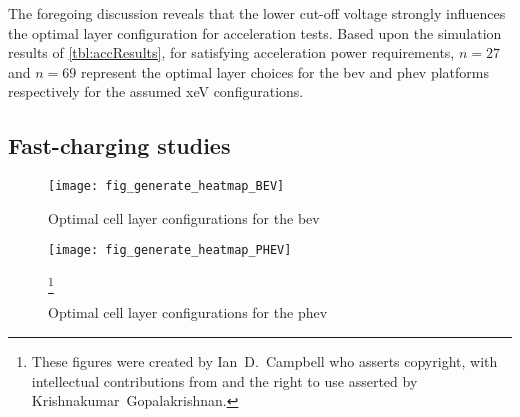 The foregoing  discussion reveals  that the lower cut-off  voltage strongly
influences  the optimal layer   configuration  for   acceleration  tests.
Based upon the simulation results of \cref{tbl:accResults},  for satisfying
acceleration power requirements, ${n = 27}$ and ${n=69}$ represent the optimal
layer choices for the \gls{bev} and \gls{phev} platforms respectively for the
assumed \gls{xeV} configurations.

\subsection{Fast-charging studies}\label{sec:fastchgresults}

\begin{figure}[p]
    \begin{minipage}[t]{\textwidth}
        \centering
        \texttt{[image: fig\_generate\_heatmap\_BEV]}
        \captionsetup{labelsep=note}
        \caption[Optimal cell layer configurations for the  for a range of fast charging powers and thermal conditions]{Optimal cell layer configurations for the \gls{bev}}
        \label{fig:fig_generate_heatmap_BEV}
        \setcounter{footnote}{8}
        \vspace*{\floatsep}
        \texttt{[image: fig\_generate\_heatmap\_PHEV]}
        \caption[Optimal cell layer configurations for the  for a range of
        fast charging powers and thermal conditions]{Optimal cell layer configurations for the \gls{phev}}
        \label{fig:fig_generate_heatmap_PHEV}
        \mpfootnotes[1]
        \footnote{These figures were created by \mbox{Ian D.\ Campbell} who asserts copyright,
            with intellectual contributions from and the right to use asserted by
        \mbox{Krishnakumar Gopalakrishnan}.}
    \end{minipage}
\end{figure}

